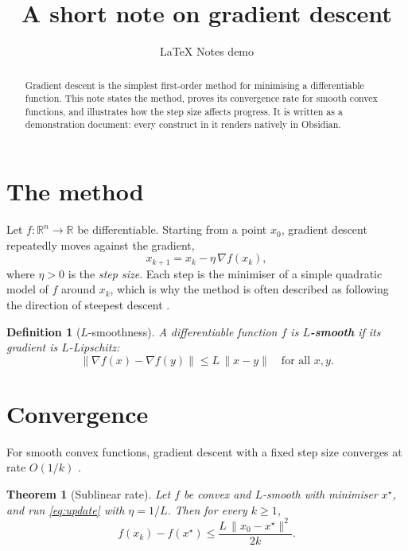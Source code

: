 \documentclass[11pt]{article}
\title{A short note on gradient descent}
\author{LaTeX Notes demo}
\date{}
\newtheorem{theorem}{Theorem}
\newtheorem{definition}{Definition}
\begin{document}
\maketitle

\begin{abstract}
Gradient descent is the simplest first-order method for minimising a differentiable function. This note states the method, proves its convergence rate for smooth convex functions, and illustrates how the step size affects progress. It is written as a demonstration document: every construct in it renders natively in Obsidian.
\end{abstract}

\section{The method}
\label{sec:method}

Let $f \colon \mathbb{R}^n \to \mathbb{R}$ be differentiable. Starting from a point $x_0$, gradient descent repeatedly moves against the gradient,
\begin{equation}
	x_{k+1} = x_k - \eta \, \nabla f(x_k),
	\label{eq:update}
\end{equation}
where $\eta > 0$ is the \emph{step size}. Each step is the minimiser of a simple quadratic model of $f$ around $x_k$, which is why the method is often described as following the direction of steepest descent \citep{boyd2004convex}.

\begin{definition}[$L$-smoothness]
\label{def:smooth}
A differentiable function $f$ is \textbf{$L$-smooth} if its gradient is $L$-Lipschitz:
\[
	\lVert \nabla f(x) - \nabla f(y) \rVert \le L \, \lVert x - y \rVert \quad \text{for all } x, y.
\]
\end{definition}

\section{Convergence}
\label{sec:convergence}

For smooth convex functions, gradient descent with a fixed step size converges at rate $O(1/k)$ \citep{nesterov2004introductory}.

\begin{theorem}[Sublinear rate]
\label{thm:rate}
Let $f$ be convex and $L$-smooth with minimiser $x^\star$, and run \eqref{eq:update} with $\eta = 1/L$. Then for every $k \ge 1$,
\begin{equation}
	f(x_k) - f(x^\star) \le \frac{L \, \lVert x_0 - x^\star \rVert^2}{2k}.
	\label{eq:rate}
\end{equation}
\end{theorem}
\end{document}
